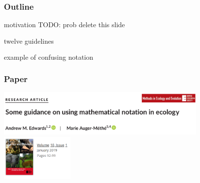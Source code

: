 

\begin{frame}
\frametitle{Outline}
\bi
  \item motivation  TODO: prob delete this slide
  \item twelve guidelines
  \item {}
  \item example of confusing notation
  \item {}
\ei
\end{frame}


\begin{frame}
\frametitle{Paper}


\begin{center}
\includegraphics[height=2.3cm]{images/mee-snip.png}
\includegraphics[height=2.3cm]{images/mee-snip-ref.png}\\
\end{center}

\bigskip



\end{frame}

